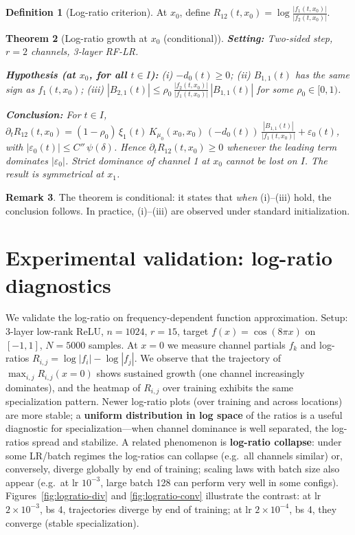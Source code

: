 \documentclass{article}
\theoremstyle{plain}
\newtheorem{theorem}{Theorem}[section]
\theoremstyle{definition}
\newtheorem{definition}[theorem]{Definition}
\newtheorem{remark}[theorem]{Remark}
\begin{document}
\begin{definition}[Log-ratio criterion]
At $x_0$, define $R_{12}(t,x_0) = \log\frac{|f_1(t,x_0)|}{|f_2(t,x_0)|}$.
\end{definition}

\begin{theorem}[Log-ratio growth at $x_0$ (conditional)]
\label{thm:logratio}
\textbf{Setting:} Two-sided step, $r=2$ channels, 3-layer RF-LR.

\textbf{Hypothesis (at $x_0$, for all $t\in I$):} (i) $-d_0(t)\ge 0$; (ii) $B_{1,1}(t)$ has the same sign as $f_1(t,x_0)$; (iii) $|B_{2,1}(t)|\le \rho_0\,\frac{|f_2(t,x_0)|}{|f_1(t,x_0)|}\,|B_{1,1}(t)|$ for some $\rho_0\in[0,1)$.

\textbf{Conclusion:} For $t\in I$, $\partial_t R_{12}(t,x_0) = (1-\rho_0)\,\xi_1(t)\,K_{\mu_0}(x_0,x_0)\,(-d_0(t))\,\frac{|B_{1,1}(t)|}{|f_1(t,x_0)|} + \varepsilon_0(t)$, with $|\varepsilon_0(t)|\le C''\,\psi(\delta)$. Hence $\partial_t R_{12}(t,x_0)\ge 0$ whenever the leading term dominates $|\varepsilon_0|$. Strict dominance of channel 1 at $x_0$ cannot be lost on $I$. The result is symmetrical at $x_1$.
\end{theorem}

\begin{remark}
The theorem is conditional: it states that \emph{when} (i)--(iii) hold, the conclusion follows. In practice, (i)--(iii) are observed under standard initialization.
\end{remark}

\section{Experimental validation: log-ratio diagnostics}
\label{sec:experiments}

We validate the log-ratio on frequency-dependent function approximation. Setup: 3-layer low-rank ReLU, $n=1024$, $r=15$, target $f(x)=\cos(8\pi x)$ on $[-1,1]$, $N=5000$ samples. At $x=0$ we measure channel partials $f_k$ and log-ratios $R_{i,j}=\log|f_i|-\log|f_j|$. We observe that the trajectory of $\max_{i,j}R_{i,j}(x=0)$ shows sustained growth (one channel increasingly dominates), and the heatmap of $R_{i,j}$ over training exhibits the same specialization pattern. Newer log-ratio plots (over training and across locations) are more stable; a \textbf{uniform distribution in log space} of the ratios is a useful diagnostic for specialization---when channel dominance is well separated, the log-ratios spread and stabilize. A related phenomenon is \textbf{log-ratio collapse}: under some LR/batch regimes the log-ratios can collapse (e.g.\ all channels similar) or, conversely, diverge globally by end of training; scaling laws with batch size also appear (e.g.\ at lr $10^{-3}$, large batch 128 can perform very well in some configs). Figures~\ref{fig:logratio-div} and \ref{fig:logratio-conv} illustrate the contrast: at lr $2{\times}10^{-3}$, bs 4, trajectories diverge by end of training; at lr $2{\times}10^{-4}$, bs 4, they converge (stable specialization).
\end{document}

